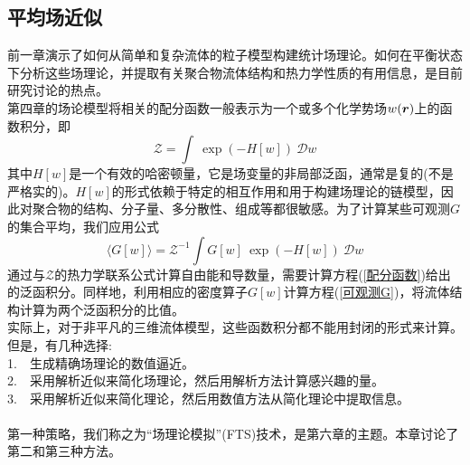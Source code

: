 \subsection{平均场近似}
前一章演示了如何从简单和复杂流体的粒子模型构建统计场理论。如何在平衡状态下分析这些场理论，并提取有关聚合物流体结构和热力学性质的有用信息，是目前研究讨论的热点。\\

第四章的场论模型将相关的配分函数一般表示为一个或多个化学势场$w(\bm{r})$上的函数积分，即\\
\begin{equation}
	\mathcal{Z}=\int  \ \exp(-H[w])\ \mathcal{D}w \label{配分函数}
\end{equation}
其中$H[w]$是一个有效的哈密顿量，它是场变量的非局部泛函，通常是复的(不是严格实的)。$H[w]$的形式依赖于特定的相互作用和用于构建场理论的链模型，因此对聚合物的结构、分子量、多分散性、组成等都很敏感。为了计算某些可观测$G$的集合平均，我们应用公式\\
\begin{equation}
	\langle G[w]\rangle = \mathcal{Z}^{-1}\int  G[w]\ \exp(-H[w])\ \mathcal{D}w \label{可观测G}
\end{equation}
通过与$\mathcal{Z}$的热力学联系公式计算自由能和导数量，需要计算方程(\ref{配分函数})给出的泛函积分。同样地，利用相应的密度算子$G[w]$计算方程(\ref{可观测G})，将流体结构计算为两个泛函积分的比值。\\

实际上，对于非平凡的三维流体模型，这些函数积分都不能用封闭的形式来计算。但是，有几种选择:\\

1.\ \ 生成精确场理论的数值逼近。\\

2.\ \ 采用解析近似来简化场理论，然后用解析方法计算感兴趣的量。\\

3.\ \ 采用解析近似来简化理论，然后用数值方法从简化理论中提取信息。\\
\\
第一种策略，我们称之为“场理论模拟”(FTS)技术，是第六章的主题。本章讨论了第二和第三种方法。\\

